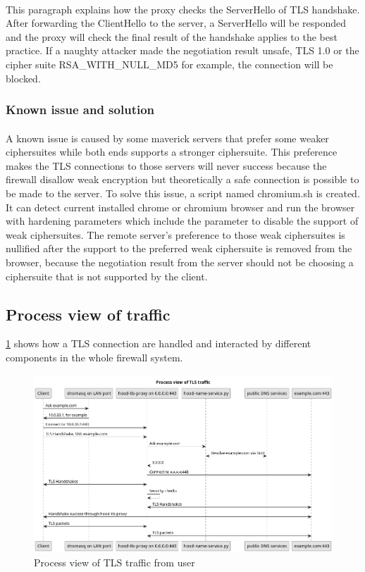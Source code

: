 \documentclass[mscthesis]{usiinfthesis}
\begin{document}
\paragraph{}
This paragraph explains how the proxy checks the ServerHello of TLS handshake. After forwarding the ClientHello to the server, a ServerHello will be responded and the proxy will check the final result of the handshake applies to the best practice. If a naughty attacker made the negotiation result unsafe, TLS 1.0 or the cipher suite RSA\_WITH\_NULL\_MD5 for example, the connection will be blocked.

\subsubsection{Known issue and solution}
\paragraph{}
A known issue is caused by some maverick servers that prefer some weaker ciphersuites while both ends supports a stronger ciphersuite. This preference makes the TLS connections to those servers will never success because the firewall disallow weak encryption but theoretically a safe connection is possible to be made to the server. To solve this issue, a script named chromium.sh is created. It can detect current installed chrome or chromium browser and run the browser with hardening parameters which include the parameter to disable the support of weak ciphersuites. The remote server's preference to those weak ciphersuites is nullified after the support to the preferred weak ciphersuite is removed from the browser, because the negotiation result from the server should not be choosing a ciphersuite that is not supported by the client.

\begin{landscape}
  \section{Process view of traffic}
  \cref{fig:tls-process-view} shows how a TLS connection are handled and interacted by different components in the whole firewall system.
  \begin{figure}[H]
    \includegraphics[width=.9\linewidth]{graphics/puml/process-tls-traffic.png}
    \caption{Process view of TLS traffic from user}
    \label{fig:tls-process-view}
  \end{figure}
\end{landscape}
\end{document}
